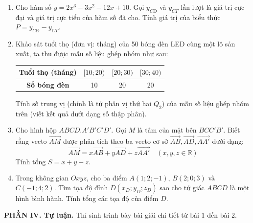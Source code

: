 \documentclass[12pt]{article}
\begin{document}
	\begin{enumerate}[label=\textbf{Câu \arabic*.}, leftmargin=*]
		
		\item Cho hàm số $y = 2x^3 - 3x^2 - 12x + 10$. Gọi $y_{CĐ}$ và $y_{CT}$ lần lượt là giá trị cực đại và giá trị cực tiểu của hàm số đã cho. Tính giá trị của biểu thức $P = y_{CĐ} - y_{CT}$.
		
		\vspace{2mm}
		\item Khảo sát tuổi thọ (đơn vị: tháng) của 50 bóng đèn LED cùng một lô sản xuất, ta thu được mẫu số liệu ghép nhóm như sau:
		\begin{center}
			\renewcommand{\arraystretch}{1.2}
			\begin{tabular}{|c|c|c|c|}
				\hline
				\textbf{Tuổi thọ (tháng)} & $[10; 20)$ & $[20; 30)$ & $[30; 40)$ \\
				\hline
				\textbf{Số bóng đèn} & 10 & 20 & 20 \\
				\hline
			\end{tabular}
		\end{center}
		Tính số trung vị (chính là tứ phân vị thứ hai $Q_2$) của mẫu số liệu ghép nhóm trên (viết kết quả dưới dạng số thập phân).
		
		\vspace{2mm}
		\item Cho hình hộp $ABCD.A'B'C'D'$. Gọi $M$ là tâm của mặt bên $BCC'B'$. Biết rằng vecto $\overrightarrow{AM}$ được phân tích theo ba vecto cơ sở $\overrightarrow{AB}, \overrightarrow{AD}, \overrightarrow{AA'}$ dưới dạng:
		\[ \overrightarrow{AM} = x\overrightarrow{AB} + y\overrightarrow{AD} + z\overrightarrow{AA'} \quad (x, y, z \in \mathbb{R}) \]
		Tính tổng $S = x + y + z$.
		
		\vspace{2mm}
		\item Trong không gian $Oxyz$, cho ba điểm $A(1; 2; -1)$, $B(2; 0; 3)$ và $C(-1; 4; 2)$. Tìm tọa độ đỉnh $D(x_D; y_D; z_D)$ sao cho tứ giác $ABCD$ là một hình bình hành. Tính tổng các tọa độ của điểm $D$.
		
	\end{enumerate}
	
	\vspace{6mm}
	\vspace{6mm}
	\noindent\textbf{PHẦN IV. Tự luận.} Thí sinh trình bày bài giải chi tiết từ bài 1 đến bài 2.
	\vspace{3mm}
	
\end{document}
